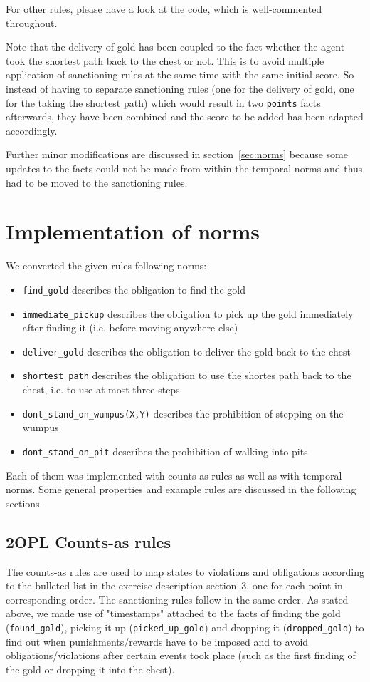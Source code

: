 \documentclass[a4paper,11pt]{article}
\begin{document}
For other rules, please have a look at the code, which is well-commented throughout.

Note that the delivery of gold has been coupled to the fact whether the agent took the shortest path back to the chest or not. This is to avoid multiple application of sanctioning rules at the same time with the same initial score. So instead of having to separate sanctioning rules (one for the delivery of gold, one for the taking the shortest path) which would result in two \texttt{points} facts afterwards, they have been combined and the score to be added has been adapted accordingly.

Further minor modifications are discussed in section~\ref{sec:norms} because some updates to the facts could not be made from within the temporal norms and thus had to be moved to the sanctioning rules.

\section{Implementation of norms}
We converted the given rules following norms:
\begin{itemize}
  \item \texttt{find\_gold} describes the obligation to find the gold
  \item \texttt{immediate\_pickup} describes the obligation to pick up the gold immediately after finding it (i.e. before moving anywhere else)
  \item \texttt{deliver\_gold} describes the obligation to deliver the gold back to the chest
  \item \texttt{shortest\_path} describes the obligation to use the shortes path back to the chest, i.e. to use at most three steps
  \item \texttt{dont\_stand\_on\_wumpus(X,Y)} describes the prohibition of stepping on the wumpus
  \item \texttt{dont\_stand\_on\_pit} describes the prohibition of walking into pits
\end{itemize}

Each of them was implemented with counts-as rules as well as with temporal norms. Some general properties and example rules are discussed in the following sections.

\subsection{2OPL Counts-as rules}
\label{sec:counts}
The counts-as rules are used to map states to violations and obligations according to the bulleted list in the exercise description section~3, one for each point in corresponding order. The sanctioning rules follow in the same order. As stated above, we made use of "timestamps" attached to the facts of finding the gold (\texttt{found\_gold}), picking it up (\texttt{picked\_up\_gold}) and dropping it (\texttt{dropped\_gold}) to find out when punishments/rewards have to be imposed and to avoid obligations/violations after certain events took place (such as the first finding of the gold or dropping it into the chest).
\end{document}
